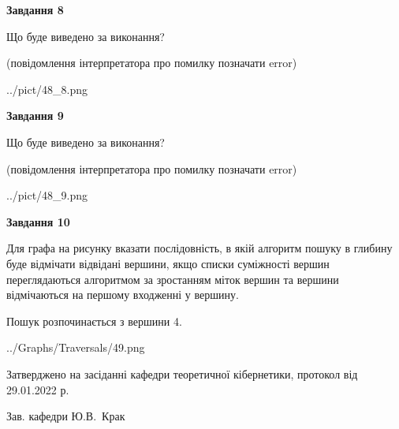 \documentclass[12pt, ukrainian]{article}
\begin{document}
{\begin {large}
{\begin {center}\textbf{Завдання 8}\end {center}}\par
Що буде виведено за виконання?\par
 (повідомлення інтерпретатора про помилку позначати error)\par
\begin{center}
	{../pict/48_8.png}
\end{center}
\newpage

{\begin {center}\textbf{Завдання 9}\end {center}}\par
Що буде виведено за виконання?\par
 (повідомлення інтерпретатора про помилку позначати error)\par
\begin{center}
	{../pict/48_9.png}
\end{center}
\newpage

{\begin {center}\textbf{Завдання 10}\end {center}}\par
Для графа на рисунку вказати послідовність, в якій алгоритм пошуку в глибину буде відмічати відвідані вершини, якщо списки суміжності вершин переглядаються алгоритмом за зростанням міток вершин та вершини відмічаються на першому вход\-женні у вершину.\par
Пошук розпочинається з вершини 4.\par

\begin{center}
	{../Graphs/Traversals/49.png}
\end{center}\par
\newpage


\end {large}
}
{\smallskip \begin {small} Затверджено на засіданні кафедри теоретичної кібернетики, протокол  від   29.01.2022 р.\par\smallskip\smallskip
{\parbox {6.5 cm}{Зав. кафедри \dotfill Ю.В.~Крак}} \end{small}}
\end{document}

